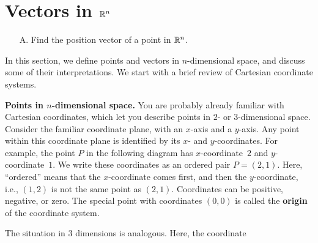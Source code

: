\section{Vectors in $\mathbb{R}^n$}

\begin{outcome}

\begin{enumerate}
\item[A.] Find the position vector of a point in $\mathbb{R}^n$.
\end{enumerate}
\end{outcome}

In this section, we define points and vectors in $n$-dimensional
space, and discuss some of their interpretations. We start with a
brief review of Cartesian coordinate systems.
\bigskip

\noindent\textbf{Points in $n$-dimensional space.}
You are probably already familiar with Cartesian
coordinates, which let you describe
points in $2$- or $3$-dimensional space. Consider the
familiar coordinate plane, with an $x$-axis and a $y$-axis. Any point
within this coordinate plane is identified by its $x$- and
$y$-coordinates. For example, the point
$P$ in the following diagram has $x$-coordinate~$2$ and
$y$-coordinate~$1$.  We write these coordinates as an ordered pair
$P=(2,1)$. Here, ``ordered'' means that the $x$-coordinate comes
first, and then the $y$-coordinate, i.e., $(1,2)$ is not the same
point as $(2,1)$. Coordinates can be positive, negative, or zero. The
special point with coordinates $(0,0)$ is called the
\textbf{origin} of the coordinate system.
\begin{center}
\end{center}
The situation in $3$ dimensions is analogous. Here, the coordinate
